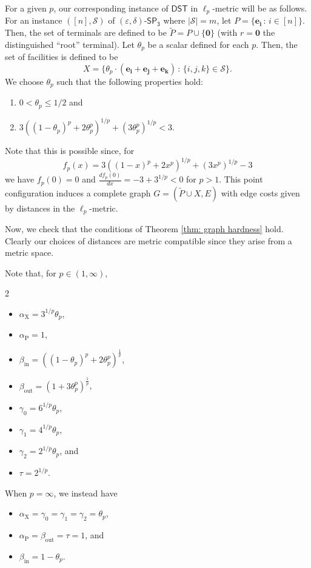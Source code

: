 \documentclass{theoretics}
\newcommand{\1}{\textbf{1}}
\newcommand{\setpT}{$\mathsf{SP_3}$\xspace}
\newcommand{\dst}{$\mathsf{DST}$\xspace}
\newcommand{\td}{\tau}
\newcommand{\pcoord}{\theta_p}
\newcommand{\srd}{\alpha_{\text{X}}}
\newcommand{\trd}{\alpha_{\text{P}}}
\renewcommand{\tilde}{\widetilde}
\begin{document}
For a given $p$, our corresponding instance of  \dst in $\ell_p$-metric will be as follows. For an instance  $([n],\mathcal{S})$ of $(\varepsilon,\delta)$-\setpT where $|\mathcal{S}|=m$, let $P = \{\mathbf{e_i} \,:\, i \in [n] \}$. Then, the set of terminals are defined to be $\tilde{P} = P \cup \{\mathbf{0}\}$ (with $r = \mathbf{0}$ the distinguished ``root'' terminal). Let $\pcoord$ be a scalar defined for each $p$. Then,  the set of facilities is defined to be 
\[
X = \{ \pcoord \cdot (\mathbf{e_i} + \mathbf{e_j} + \mathbf{e_k}) \,:\, \{i,j,k\} \in \mathcal{S} \}.
\]
We choose $\pcoord$ such that the following properties hold:
\begin{enumerate}
    \item $0 < \pcoord \leq 1/2$ and 
    \item $3 ((1-\pcoord)^p + 2\pcoord^p)^{1/p} + (3\pcoord^p)^{1/p} < 3.$
\end{enumerate}
Note that this is possible since, for
\[
f_p(x) = 3 ((1-x)^p + 2x^p)^{1/p} + (3x^p)^{1/p} - 3
\]
we have $f_p(0) = 0$ and $\frac{df_p(0)}{dx} = -3 + 3^{1/p} < 0$ for $p > 1$. This point configuration induces a complete graph $G = (\tilde{P} \cup X, E)$ with edge costs given by distances in the $\ell_p$-metric. 

Now, we check that the conditions of Theorem \ref{thm: graph hardness} hold. Clearly our choices of distances are metric compatible since they arise from a metric space. 
\begin{remark} \label{rmk: l_p distances}
Note that, for $p \in (1, \infty)$,
\begin{multicols}{2}
\begin{itemize}
    \item $\srd= 3^{1/p}\pcoord$,
    \item $\trd= 1$,
    \item $\beta_{\text{in}} = ((1-\pcoord)^p + 2\pcoord^p)^{\frac{1}{p}}$,
    \item $\beta_{\text{out}} = (1 + 3\pcoord^p)^{\frac{1}{p}}$,
    \item $\gamma_0 = 6^{1/p}\pcoord$,
    \item $\gamma_1 = 4^{1/p}\pcoord$,
    \item $\gamma_2 = 2^{1/p} \pcoord$, and 
    \item $\td = 2^{1/p}$.
\end{itemize}
\end{multicols}


When $p = \infty$, we instead have
\begin{itemize}
    \item $\srd = \gamma_0 = \gamma_1 = \gamma_2 = \pcoord$,
    \item $\trd = \beta_{\text{out}} = \td =  1$, and
    \item $\beta_{\text{in}} = 1-\pcoord$.
\end{itemize}
\end{remark}
\end{document}
